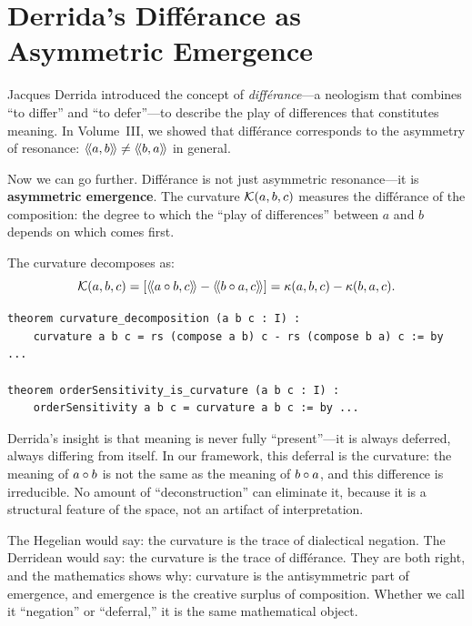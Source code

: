 \section{Derrida's Diff\'erance as Asymmetric Emergence}

Jacques Derrida introduced the concept of \emph{diff\'erance}---a neologism that
combines ``to differ'' and ``to defer''---to describe the play of differences
that constitutes meaning. In Volume~III, we showed that diff\'erance corresponds
to the asymmetry of resonance: $\langle\!\langle a, b \rangle\!\rangle \neq \langle\!\langle b, a \rangle\!\rangle$ in general.

Now we can go further. Diff\'erance is not just asymmetric resonance---it is
\textbf{asymmetric emergence}. The curvature $\mathcal{K}(a,b,c)$ measures the
diff\'erance of the composition: the degree to which the ``play of differences''
between $a$ and $b$ depends on which comes first.

\begin{theorem}
\label{thm:curvature-decomposition}
The curvature decomposes as:
\[
  \mathcal{K}(a, b, c) = [\langle\!\langle a \circ b, c \rangle\!\rangle - \langle\!\langle b \circ a, c \rangle\!\rangle]
  = \kappa(a,b,c) - \kappa(b,a,c).
\]
\end{theorem}

\begin{lstlisting}[caption={Curvature decomposition (IDT\_v3\_Emergence.lean)}]
theorem curvature_decomposition (a b c : I) :
    curvature a b c = rs (compose a b) c - rs (compose b a) c := by ...

theorem orderSensitivity_is_curvature (a b c : I) :
    orderSensitivity a b c = curvature a b c := by ...
\end{lstlisting}

\begin{interpretation}
Derrida's insight is that meaning is never fully ``present''---it is always
deferred, always differing from itself. In our framework, this deferral is
the curvature: the meaning of $a \circ b$ is not the same as the meaning
of $b \circ a$, and this difference is irreducible. No amount of
``deconstruction'' can eliminate it, because it is a structural feature of
the space, not an artifact of interpretation.

The Hegelian would say: the curvature is the trace of dialectical negation.
The Derridean would say: the curvature is the trace of diff\'erance. They are
both right, and the mathematics shows why: curvature is the antisymmetric part
of emergence, and emergence is the creative surplus of composition. Whether we
call it ``negation'' or ``deferral,'' it is the same mathematical object.
\end{interpretation}

